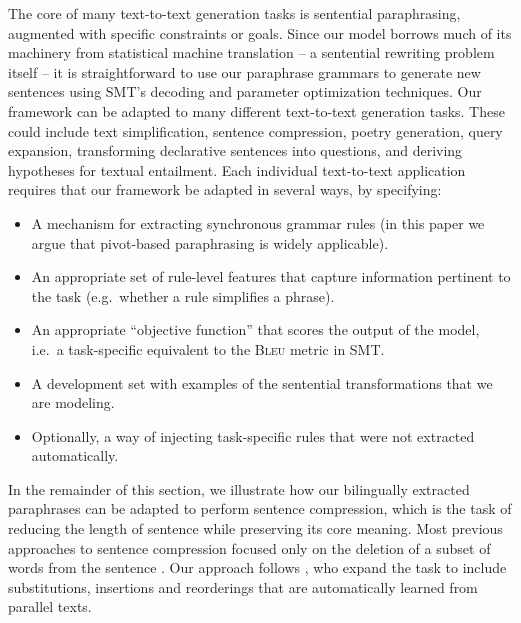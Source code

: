 \documentclass[11pt]{article}
\begin{document}
The core of many text-to-text generation tasks is sentential
paraphrasing, augmented with specific constraints or goals. Since our
model borrows much of its machinery from statistical machine
translation -- a sentential rewriting problem itself -- it is
straightforward to use our paraphrase grammars to generate new
sentences using SMT's decoding and parameter optimization
techniques. Our framework can be adapted to many different
text-to-text generation tasks.  These could include text
simplification, sentence compression, poetry generation, query
expansion, transforming declarative sentences into questions, and
deriving hypotheses for textual entailment.  Each individual
text-to-text application requires that our framework be adapted in
several ways, by specifying:
\begin{itemize}
\item A mechanism for extracting synchronous grammar rules (in this
  paper we argue that pivot-based paraphrasing is widely applicable).
\item An appropriate set of rule-level features that capture
  information pertinent to the task (e.g.\ whether a rule simplifies a
  phrase).
\item An appropriate ``objective function'' that scores the output of
  the model, i.e.\ a task-specific equivalent to the \textsc{Bleu}
  metric in SMT.
\item A development set with examples of the sentential
  transformations that we are modeling.
\item Optionally, a way of injecting task-specific rules that were not
  extracted automatically.
\end{itemize} 
In the remainder of this section, we illustrate how our bilingually
extracted paraphrases can be adapted to perform sentence compression,
which is the task of reducing the length of sentence while preserving
its core meaning.  Most previous approaches to sentence compression
focused only on the deletion of a subset of words from the sentence
\cite{KnightMarcuAI02}.  Our approach follows
, who expand the task to include
substitutions, insertions and reorderings that are automatically
learned from parallel texts.

\vspace{-.2cm}
\end{document}
